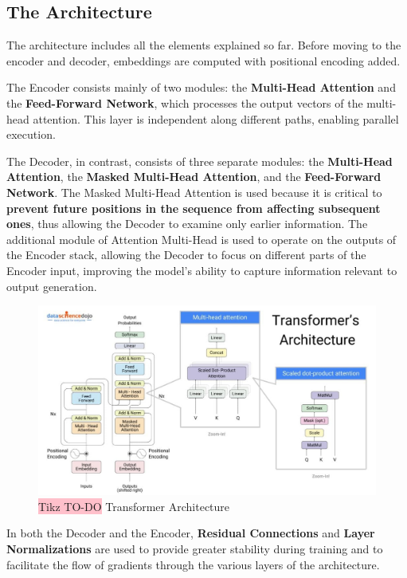 \subsection{The Architecture}

The architecture includes all the elements explained so far. Before moving to the encoder and decoder, embeddings are computed with positional encoding added.

The Encoder consists mainly of two modules: the \textbf{Multi-Head Attention} and the \textbf{Feed-Forward Network}, which processes the output vectors of the multi-head attention. This layer is independent along different paths, enabling parallel execution.

The Decoder, in contrast, consists of three separate modules: the \textbf{Multi-Head Attention}, the \textbf{Masked Multi-Head Attention}, and the \textbf{Feed-Forward Network}. The Masked Multi-Head Attention is used because it is critical to \textbf{prevent future positions in the sequence from affecting subsequent ones}, thus allowing the Decoder to examine only earlier information. The additional module of Attention Multi-Head is used to operate on the outputs of the Encoder stack, allowing the Decoder to focus on different parts of the Encoder input, improving the model's ability to capture information relevant to output generation.

\begin{figure}[!htbp]
    \centering
    \includegraphics[width=0.85\linewidth]{tikz/chapter8 - TRANSFORMERS.jpg}
    \caption{{\color{red}\colorbox{pink}{Tikz TO-DO}} Transformer Architecture}
\end{figure}

In both the Decoder and the Encoder, \textbf{Residual Connections} and \textbf{Layer Normalizations} are used to provide greater stability during training and to facilitate the flow of gradients through the various layers of the architecture.

